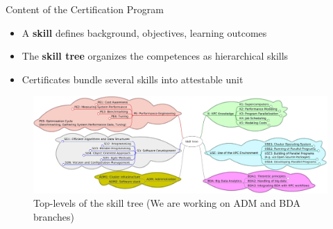 \documentclass[compress,aspectratio=169]{beamer}
\begin{document}
\begin{frame}{Content of the Certification Program}
	\begin{itemize}
		\item A \textbf{skill} defines background, objectives, learning outcomes
		\item The \textbf{skill tree} organizes the competences as hierarchical skills
		\item Certificates bundle several skills into attestable unit
	\end{itemize}

	\begin{figure}
		\includegraphics[width=\textwidth]{skill-tree}
		\vspace*{-2em}
		\caption{Top-levels of the skill tree (We are working on ADM and BDA branches)}
	\end{figure}
\end{frame}
\end{document}

